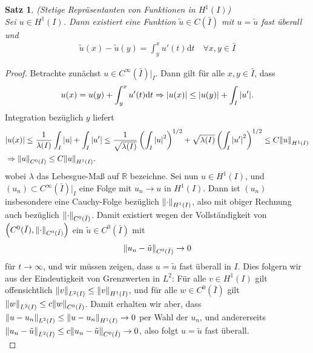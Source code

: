 \documentclass[twoside]{article}
\newcounter{lecnum}
\newtheorem{theorem}{Satz}[lecnum]
\theoremstyle{definition}
\begin{document}
\begin{theorem} (Stetige Repräsentanten von Funktionen in $H^1(I)$) \label{thm:stetig}\\
Sei $u \in H^1(I)$. Dann existiert eine Funktion $\tilde{u} \in C(\bar{I})$ mit $u = \tilde{u}$ fast überall und 
\begin{align*}
\tilde{u}(x) - \tilde{u}(y) = \int_{y}^x u'(t) \mathrm{d}t \quad \forall x,y \in \bar{I}
\end{align*}
\end{theorem}
\begin{proof}
Betrachte zunächst $u \in C^\infty(\bar{I})\vert_I$. Dann gilt für alle $x,y \in \bar{I}$, dass
\begin{align*}
u(x) = u(y) + \int_y^x u'(t) \dd t \Rightarrow \abs{u(x)} \leq \abs{u(y)} + \int_I \abs{u'}.
\end{align*}
Integration bezüglich $y$ liefert
\begin{align*}
&\abs{u(x)} \leq \frac{1}{\lambda(I)} \int_I \abs{u} +  \int_I  \abs{u'}  \leq \frac{1}{\sqrt{\lambda(I)}} \left( \int_I \abs{u}^2\right)^{1/2} + \sqrt{\lambda(I)} \left( \int_I \abs{u'}^2\right)^{1/2} \leq C \norm{u}_{H^1(I)}\\
&\Rightarrow \norm{u}_{C^0(\bar{I})} \leq C \norm{u}_{H^1(I)}.
\end{align*}
wobei $\lambda$ das Lebesgue-Maß auf $\mathbb{R}$ bezeichne. Sei nun $u \in H^1(I)$, und $(u_n) \subset C^\infty(\bar{I})\vert_I$ eine Folge mit $u_n \to u$ in $H^1(I)$. Dann ist $(u_n)$ insbesondere eine Cauchy-Folge bezüglich $\norm{\cdot}_{H^1(I)}$, also mit obiger Rechnung auch bezüglich $\norm{\cdot}_{C^0(\bar{I})}$. Damit existiert wegen der Vollständigkeit von $\left(C^0(\bar{I}), \norm{\cdot}_{C^0(\bar{I})}\right)$ ein $\tilde{u} \in C^0(\bar{I})$ mit
\begin{align*}
\norm{u_n - \tilde{u}}_{C^0(\bar{I})} \to 0
\end{align*}
für $t \to \infty$, und wir müssen zeigen, dass $u = \tilde{u}$ fast überall in $I$. Dies folgern wir aus der Eindeutigkeit von Grenzwerten in $L^2$: Für alle $v \in H^1(I)$ gilt offensichtlich $\norm{v}_{L^2(I)} \leq \norm{v}_{H^1(I)}$, und für alle $w \in C^0(\bar{I})$ gilt $\norm{w}_{L^2(I)} \leq c \norm{w}_{C^0(\bar{I})}$. Damit erhalten wir aber, dass $\norm{u-u_n}_{L^2(I)} \leq \norm{u-u_n}_{H^1(I)} \to 0$ per Wahl der $u_n$, und andererseits $\norm{u_n-\tilde{u}}_{L^2(I)} \leq c \norm{u_n-\tilde{u}}_{C^0(\bar{I})} \to 0$, also folgt $u = \tilde{u}$ fast überall.\\


\end{proof}
\end{document}
